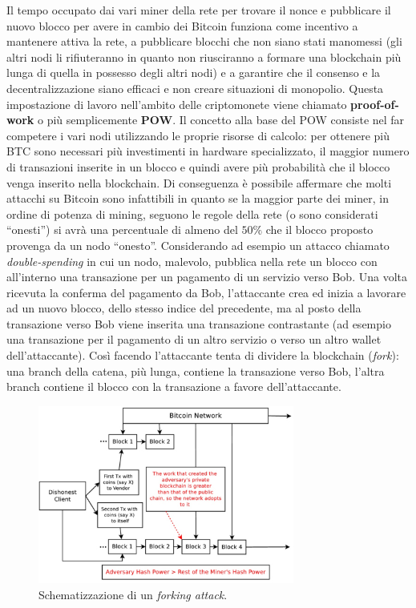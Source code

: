 Il tempo occupato dai vari miner della rete per trovare il nonce e pubblicare il nuovo blocco per avere in cambio dei Bitcoin funziona come incentivo a mantenere attiva la rete, a pubblicare blocchi che non siano stati manomessi (gli altri nodi li rifiuteranno in quanto non riusciranno a formare una blockchain più lunga di quella in possesso degli altri nodi) e a garantire che il consenso e la decentralizzazione siano efficaci e non creare situazioni di monopolio. Questa impostazione di lavoro nell'ambito delle criptomonete viene chiamato \textbf{proof-of-work} o più semplicemente \textbf{POW}. Il concetto alla base del POW consiste nel far competere i vari nodi utilizzando le proprie risorse di calcolo: per ottenere più BTC sono necessari più investimenti in hardware specializzato, il maggior numero di transazioni inserite in un blocco e quindi avere più probabilità che il blocco venga inserito nella blockchain. Di conseguenza è possibile affermare che molti attacchi su Bitcoin sono infattibili in quanto se la maggior parte dei miner, in ordine di potenza di mining, seguono le regole della rete (o sono considerati ``onesti'') si avrà una percentuale di almeno del $50\%$ che il blocco proposto provenga da un nodo ``onesto''.\newnline\newline
Considerando ad esempio un attacco chiamato \textit{double-spending} in cui un nodo, malevolo, pubblica nella rete un blocco con all'interno una transazione per un pagamento di un servizio verso Bob. Una volta ricevuta la conferma del pagamento da Bob, l'attaccante crea ed inizia a lavorare ad un nuovo blocco, dello stesso indice del precedente, ma al posto della transazione verso Bob viene inserita una transazione contrastante (ad esempio una transazione per il pagamento di un altro servizio o verso un altro wallet dell'attaccante). Così facendo l'attaccante tenta di dividere la blockchain (\textit{fork}): una branch della catena, più lunga, contiene la transazione verso Bob, l'altra branch contiene il blocco con la transazione a favore dell'attaccante.\newline
\begin{figure}
    \centering
    \includegraphics[width=0.75\textwidth]{images/forkingattack.png}
    \caption{Schematizzazione di un \textit{forking attack}.}
\end{figure}
